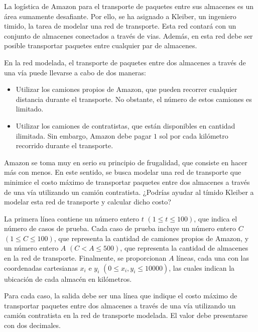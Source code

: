 
La logística de Amazon para el transporte de paquetes entre sus almacenes es un área sumamente desafiante. Por ello, se ha asignado a Kleiber, un ingeniero timido, la tarea de modelar una red de transporte. Esta red contará con un conjunto de almacenes conectados a través de vias. Además, en esta red debe ser posible transportar paquetes entre cualquier par de almacenes.

En la red modelada, el transporte de paquetes entre dos almacenes a través de una vía puede llevarse a cabo de dos maneras:
 \begin{itemize}
    \item Utilizar los camiones propios de Amazon, que pueden recorrer cualquier distancia durante el transporte. No obstante, el número de estos camiones es limitado.
    \item Utilizar los camiones de contratistas, que están disponibles en cantidad ilimitada. Sin embargo, Amazon debe pagar $1$ sol por cada kilómetro recorrido durante el transporte.
\end{itemize}
Amazon se toma muy en serio su principio de frugalidad, que consiste en hacer más con menos. En este sentido, se busca modelar una red de transporte que minimice el costo máximo de transportar paquetes entre dos almacenes a través de una vía utilizando un camión contratista. ¿Podrías ayudar al tímido Kleiber a modelar esta red de transporte y calcular dicho costo?


La primera línea contiene un número entero $t$ $(1 \leq t \leq 100)$, que indica el número de casos de prueba. Cada caso de prueba incluye un número entero $C$ $(1 \leq C \leq 100)$, que representa la cantidad de camiones propios de Amazon, y un número entero $A$ $(C < A \leq 500)$, que representa la cantidad de almacenes en la red de transporte. Finalmente, se proporcionan $A$ líneas, cada una con las coordenadas cartesianas $x_i$ e $y_i$ $(0 \leq x_i, y_i \leq 10000)$, las cuales indican la ubicación de cada almacén en kilómetros.

\outputText

Para cada caso, la salida debe ser una línea que indique el costo máximo de transportar paquetes entre dos almacenes a través de una vía utilizando un camión contratista en la red de transporte modelada. El valor debe presentarse con dos decimales.

